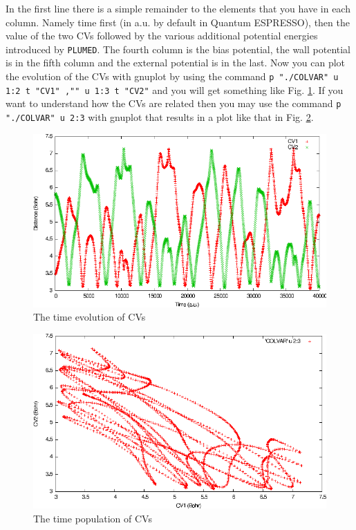 \documentclass[12pt,a4paper]{article}
\def\qe{{\sc Quantum ESPRESSO}}
\begin{document}
In the first line there is a simple remainder to the elements that you have in each column. Namely time first (in a.u. by default in \qe), then the value of the two CVs followed by the various additional potential energies introduced by \texttt{PLUMED}.  The fourth column is the bias potential, the wall potential is in the fifth column and the external potential is in the last. Now you can plot the evolution of the CVs with gnuplot by using the command \texttt{p "./COLVAR" u 1:2 t "CV1" ,"" u 1:3 t "CV2"} and you will get something like Fig. \ref{FIG_sn2_cv}. If you want to understand how the CVs are related then you may use the command \texttt{p "./COLVAR" u 2:3} with gnuplot that results in a plot like that in Fig. \ref{FIG_sn2_cvs}.

\begin{figure}[htbp]
\begin{center}
\includegraphics[width=\textwidth]{./pic/sn2cv.pdf}
\caption{The time evolution of CVs}
\label{FIG_sn2_cv}
\end{center}
\end{figure}

\begin{figure}[htbp]
\begin{center}
\includegraphics[width=\textwidth]{./pic/sn2cvs.pdf}
\caption{The time population of CVs}
\label{FIG_sn2_cvs}
\end{center}
\end{figure}
\end{document}
